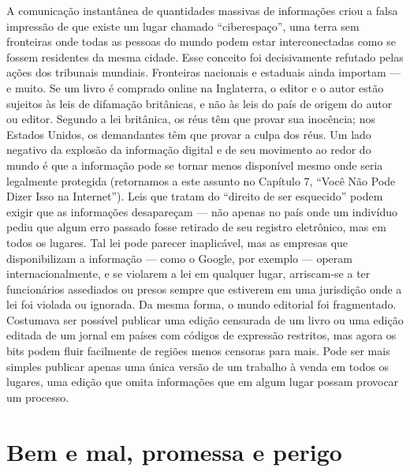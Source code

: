 A comunicação instantânea de quantidades massivas de informações criou a falsa
impressão de que existe um lugar chamado ``ciberespaço'',
uma terra sem fronteiras onde todas as pessoas do mundo podem estar
interconectadas como se fossem residentes da mesma cidade. Esse conceito foi
decisivamente refutado pelas ações dos tribunais mundiais. Fronteiras nacionais
e estaduais ainda importam --- e muito. Se um livro é comprado online na
Inglaterra, o editor e o autor estão sujeitos às leis de difamação britânicas, e
não às leis do país de origem do autor ou editor. Segundo a lei britânica, os
réus têm que provar sua inocência; nos Estados Unidos, os demandantes têm que
provar a culpa dos réus. Um lado negativo da explosão da informação digital e de
seu movimento ao redor do mundo é que a informação pode se tornar menos
disponível mesmo onde seria legalmente protegida (retornamos a este assunto no
Capítulo 7, ``Você Não Pode Dizer Isso na Internet''). Leis que tratam do
``direito de ser esquecido'' podem exigir que as informações desapareçam --- não
apenas no país onde um indivíduo pediu que algum erro passado fosse retirado de
seu registro eletrônico, mas em todos os lugares. Tal lei pode parecer
inaplicável, mas as empresas que disponibilizam a informação --- como o Google,
por exemplo --- operam internacionalmente, e se violarem a lei em qualquer
lugar, arriscam-se a ter funcionários assediados ou presos sempre que estiverem
em uma jurisdição onde a lei foi violada ou ignorada. Da mesma forma, o mundo
editorial foi fragmentado. Costumava ser possível publicar uma edição censurada
de um livro ou uma edição editada de um jornal em países com códigos de
expressão restritos, mas agora os bits podem fluir facilmente de regiões menos
censoras para mais. Pode ser mais simples publicar apenas uma única versão de um
trabalho à venda em todos os lugares, uma edição que omita informações que em
algum lugar possam provocar um processo.

\section{Bem e mal, promessa e perigo}
\label{cap1:exp-dig-perigo}

